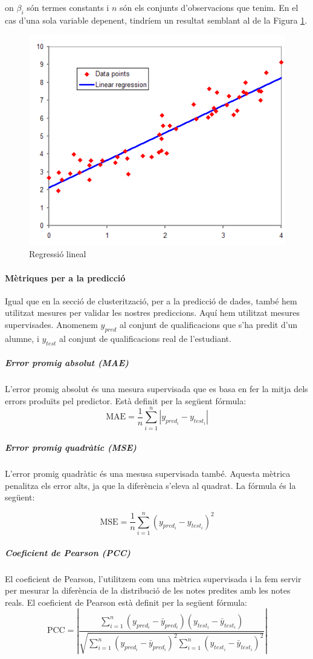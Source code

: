 \documentclass[12pt,a4paper,catalan]{article}
\begin{document}
on $\beta_i$ són termes constants i $n$ són els conjunts d'observacions que tenim. En el cas d'una sola variable depenent, tindríem un resultat semblant al de la Figura \ref{fig:linearregressor}.

\begin{figure}[h]
\centering
\includegraphics[width=.5\linewidth]{img/linearregression.png}
\caption{Regressió lineal \cite{imglinearregressor}}
\label{fig:linearregressor}
\end{figure}

\paragraph{Mètriques per a la predicció}
\label{par:metriquespredictors}
Igual que en la secció de clusterització, per a la predicció de dades, també hem utilitzat mesures per validar les nostres prediccions. Aquí hem utilitzat mesures supervisades. Anomenem $y_{pred}$ al conjunt de qualificacions que s'ha predit d'un alumne, i $y_{test}$ al conjunt de qualificacions real de l'estudiant.

\subparagraph{Error promig absolut (MAE)}
L'error promig absolut \cite{mae} és una mesura supervisada que es basa en fer la mitja dels errors produïts pel predictor. Està definit per la següent fórmula:
$$ \mathrm{MAE} = \frac{1}{n}\sum_{i=1}^n \left| y_{pred_i}-y_{test_i}\right| $$

\subparagraph{Error promig quadràtic (MSE)}
L'error promig quadràtic \cite{mse} és una mesusa supervisada també. Aquesta mètrica penalitza els error alts, ja que la diferència s'eleva al quadrat. La fórmula és la següent:

$$\mathrm{MSE}=\frac{1}{n}\sum_{i=1}^n(y_{pred_i}-y_{test_i})^2$$

\subparagraph{Coeficient de Pearson (PCC)}
El coeficient de Pearson, l'utilitzem com una mètrica supervisada i la fem servir per mesurar la diferència de la distribució de les notes predites amb les notes reals. El coeficient de Pearson està definit per la següent fórmula:
$$\mathrm{PCC} =\left| \frac{\sum_{i=1}^n(y_{pred_i} - \bar{y}_{pred_i})(y_{test_i} - \bar{y}_{test_i})}{\sqrt{\sum_{i=1}^n(y_{pred_i} - \bar{y}_{pred_i})^2  \sum_{i=1}^n(y_{test_i} - \bar{y}_{test_i})^2}}\right|$$
\end{document}
